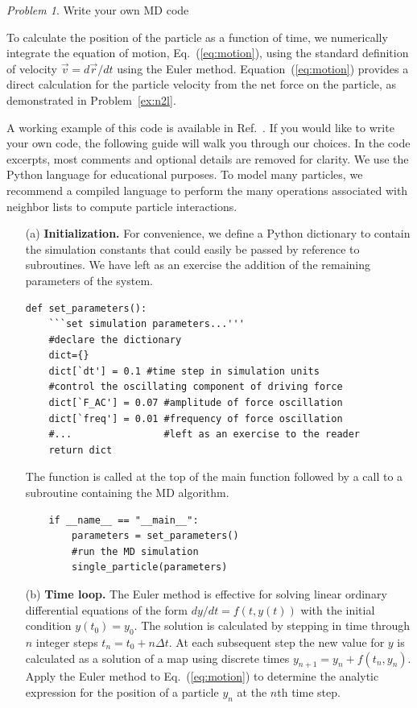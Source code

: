 \documentclass[preprint,showpacs,preprintnumbers,amsmath,amssymb,aps,prb]{revtex4-1}
\theoremstyle{remark}
\newtheorem{problem}{Problem}
\begin{document}
\begin{problem}{Write your own MD code}
  \label{ex:euler}
 
  \noindent To calculate the position of the particle
  as a function of time,
  we
  numerically integrate the equation of motion,
  Eq.~(\ref{eq:motion}),
  using
  the standard definition of velocity
  $\vec{v} = d\vec{r}/dt$ 
  using the 
  Euler method.
  Equation~(\ref{eq:motion}) provides
  a direct calculation for the particle velocity
  from the net force on the particle,
  as demonstrated in Problem~\ref{ex:n2l}.

    A working example of this code is available
  in Ref.~.
  If you would like to write your own code,
  the following guide
  will walk you through our choices.
  In the code excerpts,
  most comments and optional details are removed for clarity.
We use the Python 
  language
  for educational purposes.
  To model many particles,
we recommend a   
  compiled  language
  to perform the many operations associated
  with neighbor lists to compute particle interactions.
  
  \begin{enumerate}
    
  \item[(a)] {\bf Initialization.}
    For convenience,
    we define a Python dictionary
    to contain the simulation constants
    that could easily be passed by reference
    to subroutines.
    We have left as an exercise  the addition
    of the remaining parameters of the system.
    \begin{verbatim}
def set_parameters():           
    ```set simulation parameters...'''
    #declare the dictionary     
    dict={}  
    dict[`dt'] = 0.1 #time step in simulation units
    #control the oscillating component of driving force
    dict[`F_AC'] = 0.07 #amplitude of force oscillation
    dict[`freq'] = 0.01 #frequency of force oscillation
    #...                #left as an exercise to the reader
    return dict
    \end{verbatim}

    The function is called at the top of the main function
    followed by a call to a subroutine
    containing the MD algorithm.
     \begin{verbatim}
    if __name__ == "__main__":
        parameters = set_parameters()
        #run the MD simulation
        single_particle(parameters)
\end{verbatim}

   \item[(b)] {\bf Time loop.}
     The Euler method is effective
     for solving linear ordinary differential  equations
     of the form
     $dy/dt = f(t,y(t))$ with the initial condition $y(t_0) = y_0$.
     The solution is calculated 
     by stepping in time through $n$ integer steps
     $t_n = t_0 + n \Delta t$.
     At each subsequent step the new
     value for $y$ is calculated as a  solution of a map using
     discrete times 
     $y_{n+1} = y_n + f(t_n,y_n)$.
     Apply the Euler method to 
     Eq.~(\ref{eq:motion})
     to determine  the analytic expression
     for the position of a particle
     $y_n$ at the $n$th time step.
  

\end{enumerate}
\end{problem}
\end{document}
